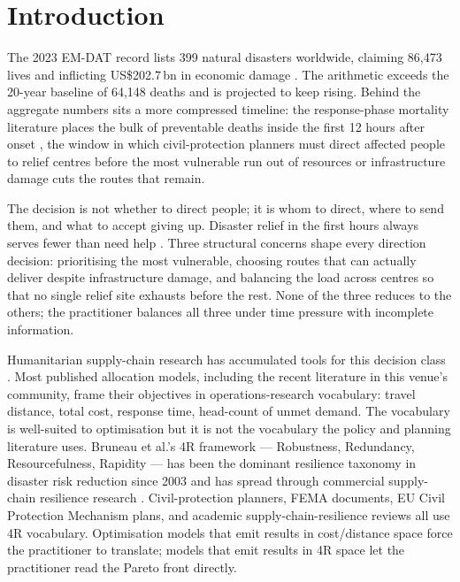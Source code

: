 \documentclass[applsci,article,submit,moreauthors,pdftex]{Definitions/mdpi}
\begin{document}
\section{Introduction}\label{sec:intro}

The 2023 EM-DAT record lists 399 natural disasters worldwide, claiming
86{,}473 lives and inflicting US\$202.7\,bn in economic damage
\cite{cred2023, wirtz2014}. The arithmetic exceeds the 20-year baseline of
64{,}148 deaths and is projected to keep rising. Behind the aggregate
numbers sits a more compressed timeline: the response-phase mortality
literature places the bulk of preventable deaths inside the first 12 hours
after onset \cite{avishan2023}, the window in which civil-protection
planners must direct affected people to relief centres before the most
vulnerable run out of resources or infrastructure damage cuts the routes
that remain.

The decision is not whether to direct people; it is whom to direct, where
to send them, and what to accept giving up. Disaster relief in the first
hours always serves fewer than need help \cite{krishna2021, behl2019}.
Three structural concerns shape every direction decision: prioritising the
most vulnerable, choosing routes that can actually deliver despite
infrastructure damage, and balancing the load across centres so that no
single relief site exhausts before the rest. None of the three reduces to
the others; the practitioner balances all three under time pressure with
incomplete information.

Humanitarian supply-chain research has accumulated tools for this decision
class \cite{christopher2004, tukamuhabwa2015, behl2019}. Most published
allocation models, including the recent literature in this venue's
community, frame their objectives in operations-research vocabulary:
travel distance, total cost, response time, head-count of unmet demand.
The vocabulary is well-suited to optimisation but it is not the vocabulary
the policy and planning literature uses. Bruneau et al.'s 4R framework
\cite{bruneau2003} --- Robustness, Redundancy, Resourcefulness, Rapidity ---
has been the dominant resilience taxonomy in disaster risk reduction since
2003 and has spread through commercial supply-chain resilience research
\cite{christopher2004, hosseini2016}. Civil-protection planners, FEMA
documents, EU Civil Protection Mechanism plans, and academic
supply-chain-resilience reviews all use 4R vocabulary. Optimisation models
that emit results in cost/distance space force the practitioner to
translate; models that emit results in 4R space let the practitioner read
the Pareto front directly.
\end{document}
